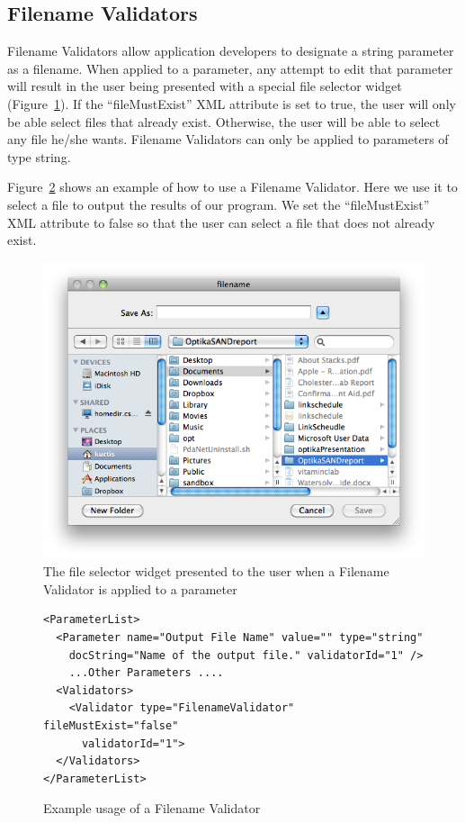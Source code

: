 \subsection{Filename Validators}
Filename Validators allow application developers to designate a string parameter as a filename. When applied to a parameter,
any attempt to edit that parameter will result in the user being presented with a special file selector widget (Figure~\ref{fileSelectorWidget}). If the 
``fileMustExist'' XML attribute is set to true, the user will only be able select files that already exist. Otherwise, the user will be able
to select any file he/she wants. Filename Validators can only be applied to parameters of type string. 

Figure~\ref{filenameValidatorXML} shows an example of how to use a Filename Validator. Here we use it to select a file to output the results
of our program. We set the ``fileMustExist'' XML attribute to false so that the user can select a file that does not already exist.
\begin{figure}
\centering
\includegraphics[scale=0.5]{graphics/fileWidget}
\caption{The file selector widget presented to the user when a Filename Validator is applied to a parameter}
\label{fileSelectorWidget}
\end{figure}

\begin{figure}
\centering
{\footnotesize
\begin{verbatim}
<ParameterList>
  <Parameter name="Output File Name" value="" type="string" 
    docString="Name of the output file." validatorId="1" />
    ...Other Parameters ....
  <Validators>
    <Validator type="FilenameValidator" fileMustExist="false" 
      validatorId="1">
  </Validators>
</ParameterList>
\end{verbatim}
}
\caption{Example usage of a Filename Validator}
\label{filenameValidatorXML}
\end{figure}


